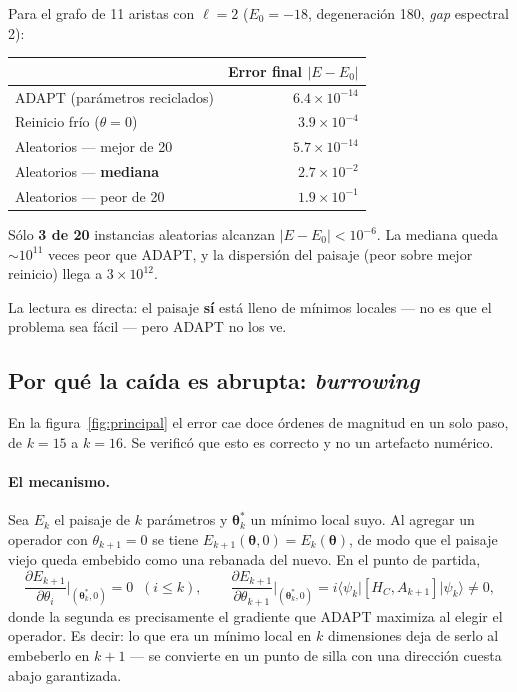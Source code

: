 \documentclass[11pt,a4paper]{article}
\newcommand{\ket}[1]{\lvert #1 \rangle}
\newcommand{\bra}[1]{\langle #1 \rvert}
\begin{document}
Para el grafo de 11 aristas con $\ell=2$ ($E_0 = -18$, degeneración 180,
\emph{gap} espectral 2):

\begin{center}
\begin{tabular}{lr}
\toprule
& Error final $|E-E_0|$ \\
\midrule
ADAPT (parámetros reciclados) & $6.4\times10^{-14}$ \\
Reinicio frío ($\theta=0$) & $3.9\times10^{-4}$ \\
Aleatorios --- mejor de 20 & $5.7\times10^{-14}$ \\
Aleatorios --- \textbf{mediana} & $2.7\times10^{-2}$ \\
Aleatorios --- peor de 20 & $1.9\times10^{-1}$ \\
\bottomrule
\end{tabular}
\end{center}

Sólo \textbf{3 de 20} instancias aleatorias alcanzan $|E-E_0|<10^{-6}$. La
mediana queda $\sim10^{11}$ veces peor que ADAPT, y la dispersión del paisaje
(peor sobre mejor reinicio) llega a $3\times10^{12}$.

La lectura es directa: el paisaje \textbf{sí} está lleno de mínimos locales
--- no es que el problema sea fácil --- pero ADAPT no los ve.

\subsection{Por qué la caída es abrupta: \emph{burrowing}}

En la figura~\ref{fig:principal} el error cae doce órdenes de magnitud en un
solo paso, de $k=15$ a $k=16$. Se verificó que esto es correcto y no un
artefacto numérico.

\paragraph{El mecanismo.} Sea $E_k$ el paisaje de $k$ parámetros y
$\boldsymbol\theta^*_k$ un mínimo local suyo. Al agregar un operador con
$\theta_{k+1}=0$ se tiene $E_{k+1}(\boldsymbol\theta,0) = E_k(\boldsymbol\theta)$,
de modo que el paisaje viejo queda embebido como una rebanada del nuevo. En el
punto de partida,
\begin{equation}
\frac{\partial E_{k+1}}{\partial\theta_i}\bigg|_{(\boldsymbol\theta^*_k,0)} = 0 \;\;(i\le k),
\qquad
\frac{\partial E_{k+1}}{\partial\theta_{k+1}}\bigg|_{(\boldsymbol\theta^*_k,0)} = i\bra{\psi_k}[H_C,A_{k+1}]\ket{\psi_k} \neq 0 ,
\end{equation}
donde la segunda es precisamente el gradiente que ADAPT maximiza al elegir el
operador. Es decir: lo que era un mínimo local en $k$ dimensiones deja de serlo
al embeberlo en $k+1$ --- se convierte en un punto de silla con una dirección
cuesta abajo garantizada.
\end{document}

